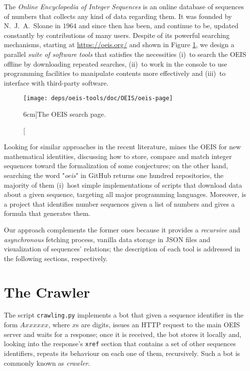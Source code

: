 
The \textit{Online Encyclopedia of Integer Sequences} \citep{OEIS} is an online
database of sequences of numbers that collects any kind of data regarding them.
It was founded by N.~J.~A.~Sloane in $1964$ and since then has been, and
continue to be, updated constantly by contributions of many users. Despite of
its powerful searching mechanisms, starting at \url{https://oeis.org/} and
shown in Figure \ref{fig:oeis:page}, we design a parallel \textit{suite of
software tools} that satisfies the necessities (i)~to search the OEIS offline
by downloading repeated searches, (ii)~to work in the console to use
programming facilities to manipulate contents more effectively and (iii)~to
interface with third-party software.

\begin{figure}
\texttt{[image: deps/oeis-tools/doc/OEIS/oeis-page]}
\caption[][6cm]{The OEIS search page.}
\label{fig:oeis:page}
\end{figure}

Looking for similar approaches in the recent literature,
\citep{Nguyen_miningthe} mines the OEIS for new mathematical identities,
discussing how to store, compare and match integer sequences toward the
formalization of some conjectures; on the other hand, searching the word
"\textit{oeis}" in GitHub returns one hundred repositories, the majority of
them (i)~host simple implementations of scripts that download data about a
given sequence, targeting all major programming languages. Moreover,
\citep{weidmann:sequencer} is a project that identifies number sequences given
a list of numbers and gives a formula that generates them.

Our approach complements the former ones because it provides a
\textit{recursive} and \textit{asynchronous} fetching process, vanilla data
storage in JSON files and visualization of sequences' relations; the
description of each tool is addressed in the following sections, respectively.

\section{The Crawler}

The script \verb|crawling.py| implements a bot that given a sequence identifier
in the form $Axxxxxx$, where $x$s are digits, issues an HTTP request to the
main OEIS server and waits for a response; once it is received, the bot stores
it locally and, looking into the response's \verb|xref| section that contains a
set of other sequences identifiers, repeats its behaviour on each one of them,
recursively.  Such a bot is commonly known as \emph{crawler}.


